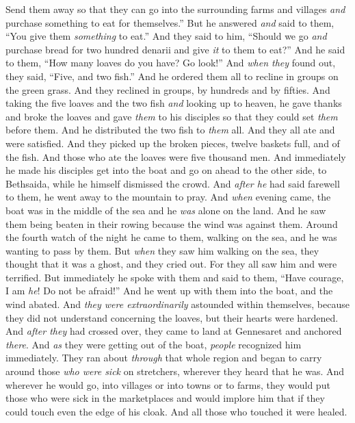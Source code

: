 \begin{biblechapter}
\verse Send them away so that they can go into the surrounding farms and villages \textit{and} purchase something to eat for themselves.”
\verse But he answered \textit{and} said to them, “You give them \textit{something} to eat.” And they said to him, “Should we go \textit{and} purchase bread for two hundred denarii and give \textit{it} to them to eat?”
\verse And he said to them, “How many loaves do you have? Go look!” And \textit{when they} found out, they said, “Five, and two fish.”
\verse And he ordered them all to recline in groups on the green grass.
\verse And they reclined in groups, by hundreds and by fifties.
\verse And taking the five loaves and the two fish \textit{and} looking up to heaven, he gave thanks and broke the loaves and gave \textit{them} to his disciples so that they could set \textit{them} before them. And he distributed the two fish to \textit{them} all.
\verse And they all ate and were satisfied.
\verse And they picked up the broken pieces, twelve baskets full, and of the fish.
\verse And those who ate the loaves were five thousand men.
 And immediately he made his disciples get into the boat and go on ahead to the other side, to Bethsaida, while he himself dismissed the crowd.
\verse And \textit{after he} had said farewell to them, he went away to the mountain to pray.
\verse And \textit{when} evening came, the boat was in the middle of the sea and he \textit{was} alone on the land.
\verse And he saw them being beaten in their rowing because the wind was against them. Around the fourth watch of the night he came to them, walking on the sea, and he was wanting to pass by them.
\verse But \textit{when} they saw him walking on the sea, they thought that it was a ghost, and they cried out.
\verse For they all saw him and were terrified. But immediately he spoke with them and said to them, “Have courage, I am \textit{he}! Do not be afraid!”
\verse And he went up with them into the boat, and the wind abated. And \textit{they were extraordinarily} astounded within themselves,
\verse because they did not understand concerning the loaves, but their hearts were hardened.
 And \textit{after they} had crossed over, they came to land at Gennesaret and anchored \textit{there}.
\verse And \textit{as} they were getting out of the boat, \textit{people} recognized him immediately.
\verse They ran about \textit{through} that whole region and began to carry around those \textit{who were sick} on stretchers, wherever they heard that he was.
\verse And wherever he would go, into villages or into towns or to farms, they would put those who were sick in the marketplaces and would implore him that if they could touch even the edge of his cloak. And all those who touched it were healed.
\end{biblechapter}

